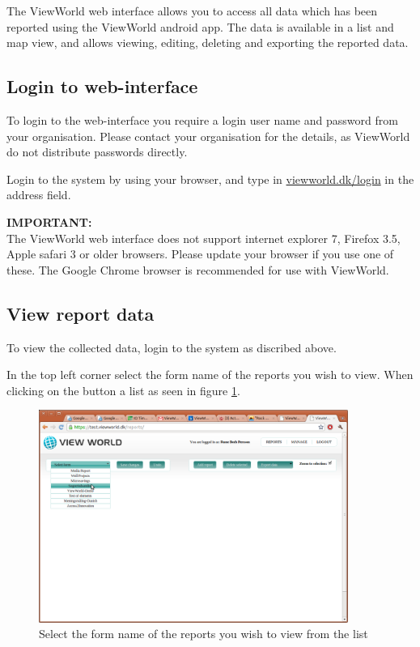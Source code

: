 \documentclass[a4paper, 12pt, final]{article}
\begin{document}
The ViewWorld web interface allows you to access all data which has been reported using the ViewWorld android app. The data is available in a list and map view, and allows viewing, editing, deleting and exporting the reported data. 

\subsection{Login to web-interface}

To login to the web-interface you require a login user name and password from your organisation. Please contact your organisation for the details, as ViewWorld do not distribute passwords directly.

Login to the system by using your browser, and type in \url{viewworld.dk/login} in the address field. 

\vspace{0.5cm}
\begin{boxedminipage}{\textwidth}
\textbf{IMPORTANT:}\\The ViewWorld web interface does not support internet explorer 7, Firefox 3.5, Apple safari 3 or older browsers. Please update your browser if you use one of these. The Google Chrome browser is recommended for use with ViewWorld.\end{boxedminipage}

\subsection{View report data}

To view the collected data, login to the system as discribed above.

In the top left corner select the form name of the reports you wish to view. When clicking on the button a list as seen in figure \ref{fig:web_select_report}.

\begin{figure}[H]
  \centering
      \includegraphics[width=0.9\textwidth]{pics/web_select_report.png}
  \caption{Select the form name of the reports you wish to view from the list}
  \label{fig:web_select_report}
\end{figure}
\end{document}
